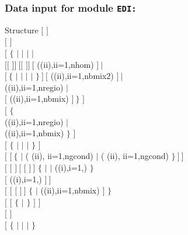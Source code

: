 \clearpage

\subsubsection{Data input for module {\tt EDI:}}\label{sect:descedi}

\begin{DataStructure}{Structure }
$[$   $]$ \\
$[$  $]$ \\
$[$  $\{$  $|$  $|$  $|$  $|$ \\
\hskip 0.8cm   $[[$      $]]~[[$        $]]~[$  ((ii),ii=1,nhom) $]~|$ \\
\hskip 0.8cm  $[~\{$  $|$  $|$  $|$  $|$  $\}~]~[$  ((ii),ii=1,nbmix2) $]~|$ \\
\hskip 0.8cm  ((ii),ii=1,nregio) $|$ \\
\hskip 0.8cm  $[$ ((ii),ii=1,nbmix) $]~\}$ $]$ \\
$[$  $\{$ \\
\hskip 0.8cm  ((ii),ii=1,nregio) $|$ \\
\hskip 0.8cm  ((ii),ii=1,nbmix) $\}$ $]$  \\
$[$ $\{$  $|$  $|$  $|$  $\}$ $]$ \\
$[$  $[~\{$   $|$ ( (ii), ii=1,ngcond) $|$ ( (ii), ii=1,ngcond) $\}~]~]$\\
$[$  $[$  $]~[$  $[$  $]~]$ $\{$  $|$  $|$ 
   ((i),i=1,) $\}$\\
\hskip 0.8cm $[$   ((i),i=1,) $]~]$\\
$[$  $[$  $[$  $]~]$ $\{$  $|$ ((ii),ii=1,nbmix) $]$ $\}$\\ 
$[$  $[$  $\{$  $|$  $\}$ $]$ $]$ \\
$[$  $]$ \\
$[$  $\{$  $|$  $|$  $|$  $\}$  

\end{DataStructure}
